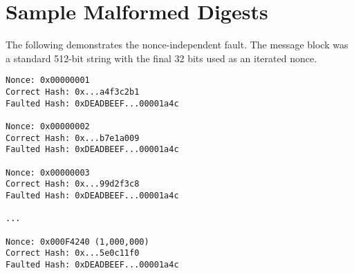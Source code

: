 \documentclass[11pt, a4paper]{article}
\begin{document}
\section{Sample Malformed Digests}\label{sec:digests}
The following demonstrates the nonce-independent fault. The message block was a standard 512-bit string with the final 32 bits used as an iterated nonce.

\begin{lstlisting}[basicstyle=\ttfamily\small, frame=single]
Nonce: 0x00000001
Correct Hash: 0x...a4f3c2b1
Faulted Hash: 0xDEADBEEF...00001a4c

Nonce: 0x00000002
Correct Hash: 0x...b7e1a009
Faulted Hash: 0xDEADBEEF...00001a4c

Nonce: 0x00000003
Correct Hash: 0x...99d2f3c8
Faulted Hash: 0xDEADBEEF...00001a4c

...

Nonce: 0x000F4240 (1,000,000)
Correct Hash: 0x...5e0c11f0
Faulted Hash: 0xDEADBEEF...00001a4c
\end{lstlisting}
\end{document}

